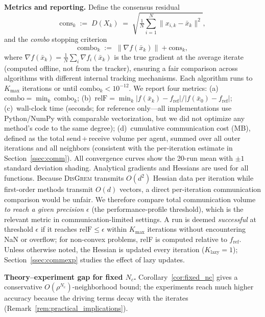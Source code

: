 \documentclass[10pt,twocolumn,letterpaper]{article}
\def\cO{O}%
\theoremstyle{compact}
\theoremstyle{compactremark}
\newcommand{\cO}{\mathcal{O}}
\begin{document}
	\noindent\textbf{Metrics and reporting.}
	Define the consensus residual
	\[
	  \mathrm{cons}_k
	  \;:=\;
	  D(X_k)
	  \;=\;
	  \sqrt{\tfrac{1}{N}\textstyle\sum_{i=1}^{N}\|x_{i,k}-\bar x_k\|^{2}},
	\]
	and the \emph{combo} stopping criterion
	\[
	  \mathrm{combo}_k
	  \;:=\;
	  \|\nabla f(\bar x_k)\| + \mathrm{cons}_k,
	\]
	where $\nabla f(\bar x_k)=\frac{1}{N}\sum_{i}\nabla f_i(\bar x_k)$
	is the true gradient at the average iterate (computed offline,
	not from the tracker), ensuring a fair comparison across algorithms
	with different internal tracking mechanisms.
	Each algorithm runs to $K_{\max}$ iterations or until
	$\mathrm{combo}_k < 10^{-12}$.
	We report four metrics:
	(a)~$\mathrm{combo}=\min_k\,\mathrm{combo}_k$;
	(b)~$\mathrm{relF}=\min_k |f(\bar x_k)-f_{\mathrm{ref}}|/|f(\bar x_0)-f_{\mathrm{ref}}|$;
	(c)~wall-clock time (seconds; for reference only---all implementations
	use Python/NumPy with comparable vectorization, but we did not
	optimize any method's code to the same degree);
	(d)~cumulative communication cost (MB), defined as the total
	send\,+\,receive volume per agent, summed over all outer iterations and all
	neighbors (consistent with the per-iteration estimate in Section~\ref{ssec:comm}).
	All convergence curves show the 20-run mean with $\pm1$ standard
	deviation shading.
	Analytical gradients and Hessians are used for all functions.
	Because \textsc{DisGrem} transmits $\cO(d^2)$ Hessian data per
	iteration while first-order methods transmit $\cO(d)$ vectors,
	a direct per-iteration communication comparison would be
	unfair.
	We therefore compare total communication volume \emph{to reach
	a given precision $\epsilon$} (the performance-profile threshold),
	which is the relevant metric in communication-limited settings.
	A run is deemed \emph{successful} at threshold $\epsilon$ if it reaches
	$\mathrm{relF}\le\epsilon$ within $K_{\max}$ iterations without
	encountering NaN or overflow; for non-convex problems, relF is
	computed relative to $f_{\mathrm{ref}}$.
	Unless otherwise noted, the Hessian is updated every iteration
	($K_{\mathrm{lazy}}{=}1$); Section~\ref{ssec:commexp} studies the
	effect of lazy updates.
	
	\noindent\textbf{Theory--experiment gap for fixed $N_c$.}
	Corollary~\ref{cor:fixed_nc} gives a conservative
	$\cO(\rho^{N_c})$-neighborhood bound; the experiments reach
	much higher accuracy because the driving terms decay with the
	iterates (Remark~\ref{rem:practical_implications}).
	
\end{document}
